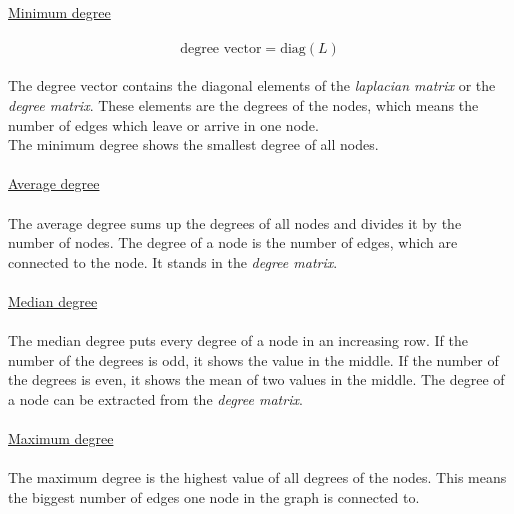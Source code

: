 \documentclass[12pt]{report}
\begin{document}
\\
\underline{Minimum degree}\\
\\
\begin{equation}
\mbox{degree vector}=\mbox{diag}(L)
\label{EQ:gleichung8}
\end{equation}
\\
The degree vector contains the diagonal elements of the \textit{laplacian matrix} or the \textit{degree matrix}. These elements are the degrees of the nodes, which means the number of edges which leave or arrive in one node.\\
The minimum degree shows the smallest degree of all nodes.\\
\\
\underline{Average degree}\\
\\
The average degree sums up the degrees of all nodes and divides it by the number of nodes. The degree of a node is the number of edges, which are connected to the node. It stands in the \textit{degree matrix}.\\
\\
\underline{Median degree}\\
\\
The median degree puts every degree of a node in an increasing row. If the number of the degrees is odd, it shows the value in the middle. If the number of the degrees is even, it shows the mean of two values in the middle. The degree of a node can be extracted from the \textit{degree matrix}.\\
\\
\underline{Maximum degree}\\
\\
The maximum degree is the highest value of all degrees of the nodes. This means the biggest number of edges one node in the graph is connected to.\\
\end{document}
